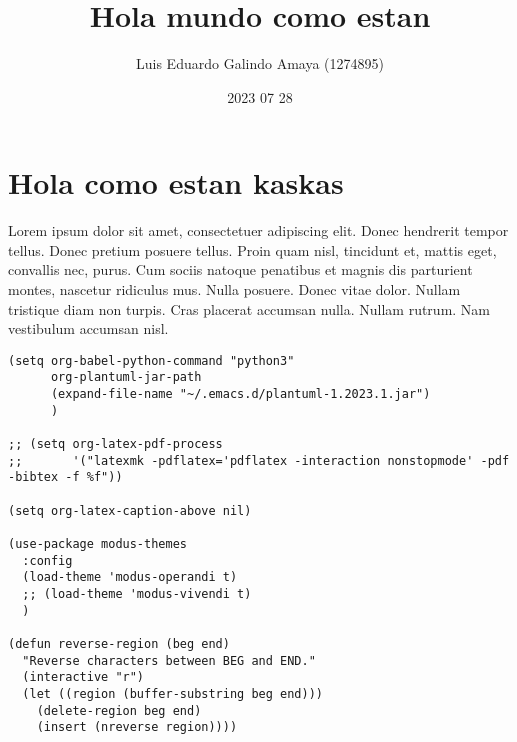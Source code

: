 \documentclass[11pt]{article}
\author{Luis Eduardo Galindo Amaya (1274895)}
\date{2023 07 28}
\title{Hola mundo como estan}
\begin{document}
\modentitlepage

\section{Hola como estan kaskas}
\label{sec:org9f7a165}
Lorem ipsum dolor sit amet, consectetuer adipiscing elit.  Donec 
hendrerit tempor tellus.  Donec pretium posuere tellus.  Proin quam 
nisl, tincidunt et, mattis eget, convallis nec, purus.  Cum sociis 
natoque penatibus et magnis dis parturient montes, nascetur ridiculus 
mus.  Nulla posuere.  Donec vitae dolor.  Nullam tristique diam non 
turpis.  Cras placerat accumsan nulla.  Nullam rutrum.  Nam vestibulum
accumsan nisl.


\begin{verbatim}
(setq org-babel-python-command "python3"
      org-plantuml-jar-path
      (expand-file-name "~/.emacs.d/plantuml-1.2023.1.jar")
      )

;; (setq org-latex-pdf-process
;;       '("latexmk -pdflatex='pdflatex -interaction nonstopmode' -pdf -bibtex -f %f"))

(setq org-latex-caption-above nil)

(use-package modus-themes
  :config
  (load-theme 'modus-operandi t)
  ;; (load-theme 'modus-vivendi t)
  )

(defun reverse-region (beg end)
  "Reverse characters between BEG and END."
  (interactive "r")
  (let ((region (buffer-substring beg end)))
    (delete-region beg end)
    (insert (nreverse region))))


\end{verbatim}
\end{document}
